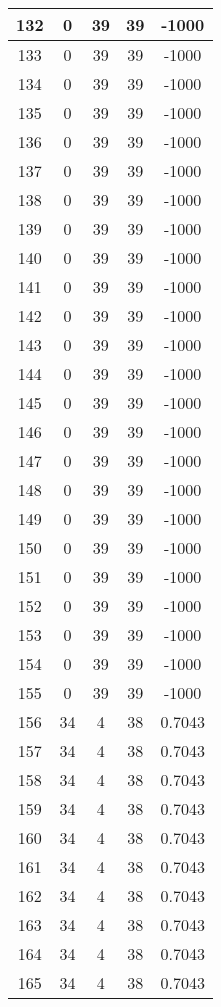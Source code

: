 \documentclass[letterpaper, 12pt]{article}
\begin{document}
\begin{longtable}{|c|c|c|c|c|}
\hline
132 & 0 & 39 & 39 & -1000 \\
\hline
133 & 0 & 39 & 39 & -1000 \\
\hline
134 & 0 & 39 & 39 & -1000 \\
\hline
135 & 0 & 39 & 39 & -1000 \\
\hline
136 & 0 & 39 & 39 & -1000 \\
\hline
137 & 0 & 39 & 39 & -1000 \\
\hline
138 & 0 & 39 & 39 & -1000 \\
\hline
139 & 0 & 39 & 39 & -1000 \\
\hline
140 & 0 & 39 & 39 & -1000 \\
\hline
141 & 0 & 39 & 39 & -1000 \\
\hline
142 & 0 & 39 & 39 & -1000 \\
\hline
143 & 0 & 39 & 39 & -1000 \\
\hline
144 & 0 & 39 & 39 & -1000 \\
\hline
145 & 0 & 39 & 39 & -1000 \\
\hline
146 & 0 & 39 & 39 & -1000 \\
\hline
147 & 0 & 39 & 39 & -1000 \\
\hline
148 & 0 & 39 & 39 & -1000 \\
\hline
149 & 0 & 39 & 39 & -1000 \\
\hline
150 & 0 & 39 & 39 & -1000 \\
\hline
151 & 0 & 39 & 39 & -1000 \\
\hline
152 & 0 & 39 & 39 & -1000 \\
\hline
153 & 0 & 39 & 39 & -1000 \\
\hline
154 & 0 & 39 & 39 & -1000 \\
\hline
155 & 0 & 39 & 39 & -1000 \\
\hline
156 & 34 & 4 & 38 & 0.7043 \\
\hline
157 & 34 & 4 & 38 & 0.7043 \\
\hline
158 & 34 & 4 & 38 & 0.7043 \\
\hline
159 & 34 & 4 & 38 & 0.7043 \\
\hline
160 & 34 & 4 & 38 & 0.7043 \\
\hline
161 & 34 & 4 & 38 & 0.7043 \\
\hline
162 & 34 & 4 & 38 & 0.7043 \\
\hline
163 & 34 & 4 & 38 & 0.7043 \\
\hline
164 & 34 & 4 & 38 & 0.7043 \\
\hline
165 & 34 & 4 & 38 & 0.7043 \\
\hline

\end{longtable}
\end{document}
